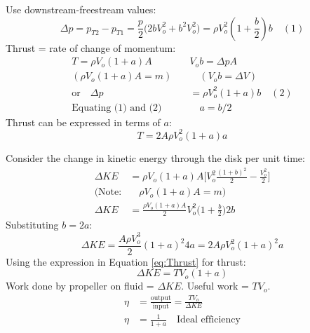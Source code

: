 \documentclass[draft=false, titlepage]{article}
\begin{document}
Use downstream-freestream values:
\begin{equation*}
\Delta p = p_{T2} - p_{T1} = \frac{p}{2} \big( 2bV_o^2 + b^2 V_o^2 \big) = \rho V_o^2 (1+\frac{b}{2})b \quad (1)
\end{equation*}
Thrust = rate of change of momentum:
\begin{align*}
T = \rho V_o (1+a)A&V_ob = \Delta p A\\
(\rho V_o (1+a)A = m) \quad&\quad (V_ob = \Delta V)\\
\text{or}\quad \Delta p &= \rho V_o^2 (1+a)b\quad (2)\\
\text{Equating (1) and (2)} &\quad a = b/2
\end{align*}
Thrust can be expressed in terms of $a$:
\begin{equation}
T = 2A\rho V_o^2 (1+a)a
\label{eq:Thrust}
\end{equation}

Consider the change in kinetic energy through the disk per unit time:
\begin{align*}
\Delta KE &= \rho V_o(1+a)A \Big[ V_o^2 \frac{(1+b)^2}{2} - \frac{V_o^2}{2} \Big]\\
(\text{Note:}&\quad \rho V_o(1+a)A = m)\\
\Delta KE &= \frac{\rho V_o (1+a)A}{2}V_o^2 \Big(1+\frac{b}{2}\Big)2b
\end{align*}
Substituting $b=2a$:
\begin{equation*}
\Delta KE = \frac{A\rho V_o^3}{2} (1+a)^2 4a = 2A\rho V_o^2 (1+a)^2 a
\end{equation*}
Using the expression in Equation \ref{eq:Thrust} for thrust:
\begin{equation}
\Delta KE = TV_o(1+a)
\end{equation}
Work done by propeller on fluid = $\Delta KE$. Useful work = $TV_o$.
\begin{align}
\eta &= \frac{\text{output}}{\text{input}} = \frac{TV_o}{\Delta KE}\\
\eta &= \frac{1}{1+a} \quad \text{Ideal efficiency}
\end{align}
\end{document}
